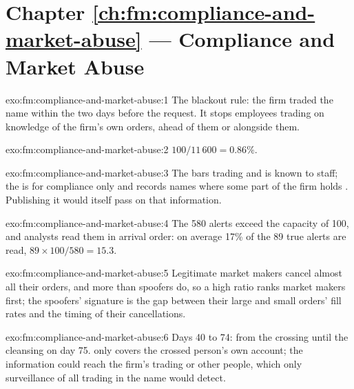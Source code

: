 \section*{Chapter \ref{ch:fm:compliance-and-market-abuse} --- Compliance and Market Abuse}

\begin{solution}{exo:fm:compliance-and-market-abuse:1}
The blackout rule: the firm traded the name within the two days before the request. It stops employees trading on knowledge of the firm's own
orders, ahead of them or alongside them.
\end{solution}

\begin{solution}{exo:fm:compliance-and-market-abuse:2}
$100/11\,600=0.86\%$.
\end{solution}

\begin{solution}{exo:fm:compliance-and-market-abuse:3}
The  bars trading and is known to staff; the  is for compliance only and records names where some part of the firm holds
. Publishing it would itself pass on that information.
\end{solution}

\begin{solution}{exo:fm:compliance-and-market-abuse:4}
The 580 alerts exceed the capacity of 100, and analysts read them in arrival order: on average 17\% of the 89 true alerts are read,
$89\times100/580=15.3$.
\end{solution}

\begin{solution}{exo:fm:compliance-and-market-abuse:5}
Legitimate market makers cancel almost all their orders, and more than spoofers do, so a high ratio ranks market makers first; the spoofers'
signature is the gap between their large and small orders' fill rates and the timing of their cancellations.
\end{solution}

\begin{solution}{exo:fm:compliance-and-market-abuse:6}
Days 40 to 74: from the crossing until the cleansing on day 75.  only covers the crossed person's own account; the information could
reach the firm's trading or other people, which only surveillance of all trading in the name would detect.
\end{solution}

